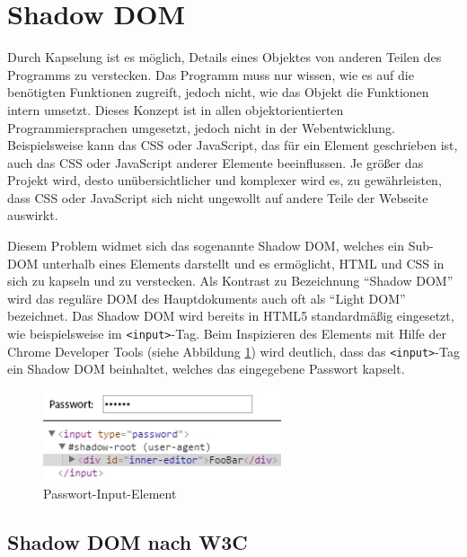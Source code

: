\section{Shadow DOM}\label{shadow-dom}

Durch Kapselung ist es möglich, Details eines Objektes von anderen Teilen des Programms zu verstecken. Das Programm muss nur wissen, wie es auf die benötigten Funktionen zugreift, jedoch nicht, wie das Objekt die Funktionen intern umsetzt. Dieses Konzept ist in allen objektorientierten Programmiersprachen umgesetzt, jedoch nicht in der Webentwicklung. Beispielsweise kann das \ac{CSS} oder JavaScript, das für ein Element geschrieben ist, auch das \ac{CSS} oder JavaScript anderer Elemente beeinflussen. Je größer das Projekt wird, desto unübersichtlicher und komplexer wird es, zu gewährleisten, dass \ac{CSS} oder JavaScript sich nicht ungewollt auf andere Teile der Webseite auswirkt.

Diesem Problem widmet sich das sogenannte Shadow \ac{DOM}, welches ein Sub-\ac{DOM} unterhalb eines Elements darstellt und es ermöglicht, \ac{HTML} und \ac{CSS} in sich zu kapseln und zu verstecken. Als Kontrast zu Bezeichnung ``Shadow \ac{DOM}'' wird das reguläre \ac{DOM} des Hauptdokuments auch oft als ``Light \ac{DOM}'' bezeichnet. Das Shadow \ac{DOM} wird bereits in \ac{HTML}5 standardmäßig eingesetzt, wie beispielsweise im \texttt{\textless{}input\textgreater{}}-Tag. Beim Inspizieren des Elements mit Hilfe der Chrome Developer Tools (siehe Abbildung \ref{fig:itpelem}) wird deutlich, dass das \texttt{\textless{}input\textgreater{}}-Tag ein Shadow \ac{DOM} beinhaltet, welches das eingegebene Passwort kapselt. \cite[S. 109-126]{citeulike:13844975}

\begin{figure}[htbp]
 \centering
 \includegraphics[width=7cm]{kapitel2/bilder/3-shadow-dom-input-type-password}
 \caption{Passwort-Input-Element}
 \label{fig:itpelem}
\end{figure}


\subsection{Shadow DOM nach W3C}\label{shadow-dom-nach-w3c}

